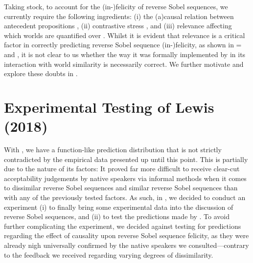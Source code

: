Taking stock, to account for the (in-)felicity of reverse Sobel sequences, we currently require the following ingredients: (i) the (a)causal relation between antecedent propositions \parencite{Klecha2014,Klecha2015}, (ii) contrastive stress \parencite{Klecha2014,Klecha2015}, and (iii) relevance affecting which worlds are quantified over \parencite{Lewis2018}. Whilst it is evident that relevance is a critical factor in correctly predicting reverse Sobel sequence (in-)felicity, as shown in = and , it is not clear to us whether the way it was formally implemented by \textcite{Lewis2018} in its interaction with world similarity is necessarily correct. We further motivate and explore these doubts in .

\section{Experimental Testing of Lewis (2018)}
With , we have a function-like prediction distribution that is not strictly contradicted by the empirical data presented up until this point. This is partially due to the nature of its factors: It proved far more difficult to receive clear-cut acceptability judgements by native speakers via informal methods when it comes to dissimilar reverse Sobel sequences and similar reverse Sobel sequences than with any of the previously tested factors. As such, in \textcite{Krassnig2020}, we decided to conduct an experiment  (i) to finally bring some experimental data into the discussion of reverse Sobel sequences, and (ii) to test the predictions made by \textcite{Lewis2018}. To avoid further complicating the experiment, we decided against testing for  predictions regarding the effect of causality upon reverse Sobel sequence felicity, as they were already nigh universally confirmed by the native speakers we consulted---contrary to the feedback we received regarding varying degrees of dissimilarity.
